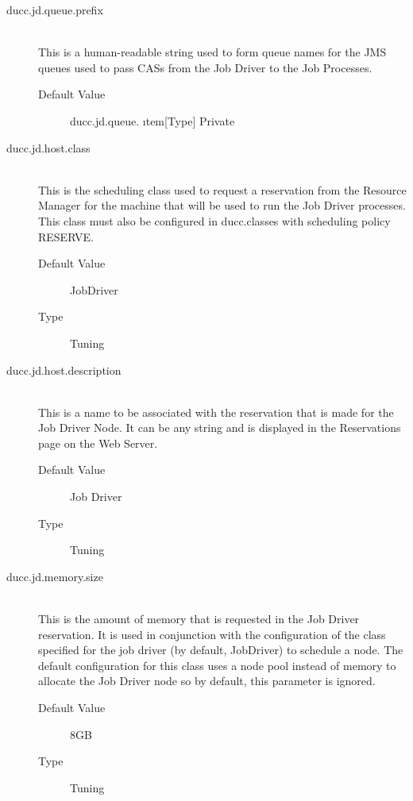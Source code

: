 \begin{description}
        \item[ducc.jd.queue.prefix] \hfill \\
          This is a human-readable string used to form queue names for the JMS queues used to pass 
          CASs from the Job Driver to the Job Processes. 
          \begin{description}
            \item[Default Value] ducc.jd.queue. 
          \i  tem[Type] Private 
          \end{description}
          
        \item[ducc.jd.host.class] \hfill \\
          This is the scheduling class used to request a reservation from the Resource Manager for 
          the machine that will be used to run the Job Driver processes. This class must also be 
          configured in ducc.classes with scheduling policy RESERVE. 
          \begin{description}
            \item[Default Value] JobDriver 
            \item[Type] Tuning 
          \end{description}
          
        \item[ducc.jd.host.description] \hfill \\
          This is a name to be associated with the reservation that is made for the Job Driver Node. 
          It can be any string and is displayed in the Reservations page on the Web Server. 
          \begin{description}
            \item[Default Value] Job Driver 
            \item[Type] Tuning 
          \end{description}

        \item[ducc.jd.memory.size] \hfill \\
          This is the amount of memory that is requested in the Job Driver reservation. It is used 
          in conjunction with the configuration of the class specified for the job driver (by default, 
          JobDriver) to schedule a node. The default configuration for this class uses a node pool 
          instead of memory to allocate the Job Driver node so by default, this parameter is ignored. 
          \begin{description}
            \item[Default Value] 8GB 
            \item[Type] Tuning 
          \end{description}
          


\end{description}
